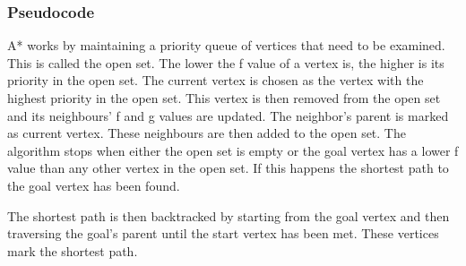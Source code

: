 

\subsubsection{Pseudocode}

A* works by maintaining a priority queue of vertices that need to be examined. This is called the open set. The lower the f value of a vertex is, the higher is its priority in the open set. The current vertex is chosen as the vertex with the highest priority in the open set. This vertex is then removed from the open set and its neighbours' f and g values are updated. The neighbor's parent is marked as current vertex. These neighbours are then added to the open set. The algorithm stops when either the open set is empty or the goal vertex has a lower f value than any other vertex in the open set. If this happens the shortest path to the goal vertex has been found.

The shortest path is then backtracked by starting from the goal vertex and then traversing the goal's parent until the start vertex has been met. These vertices mark the shortest path.

